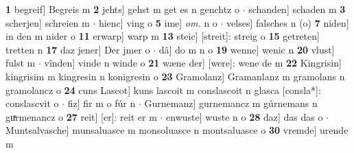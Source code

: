 \documentclass[8pt,a4paper,notitlepage]{article}
\begin{document}
\begin{table}[ht]
\begin{minipage}[t]{0.5\linewidth}
\textbf{1} begreif] Begreis m \textbf{2} jehts] gehst m get es n genchtz o  $\cdot$ schanden] schaden m \textbf{3} scherjen] schreien m  $\cdot$ hienc] ving o \textbf{5} ime] \textit{om.} n o  $\cdot$ velses] falsches n (o) \textbf{7} niden] in den m nider o \textbf{11} erwarp] warp m \textbf{13} steic] [streit]: streig o \textbf{15} getreten] tretten n \textbf{17} daz jener] Der jmer o  $\cdot$ dâ] do m n o \textbf{19} wenne] wenic n \textbf{20} vlust] fulst m  $\cdot$ vînden] vinde n winde o \textbf{21} wæne der] [were]: wene de m \textbf{22} Kingrisin] kingrisim m kingresin n konigresin o \textbf{23} Gramolanz] Gramanlanz m gramolans n gramolancz o \textbf{24} cuns Lascot] kuns lascoit m conslascoit n glasca [consla*]: conslascvit o  $\cdot$ fiz] fir m o fúr n  $\cdot$ Gurnemanz] gurnemancz m gúrnemans n guͯrmenancz o \textbf{27} reit] [er]: reit er m  $\cdot$ enwuste] wuste n o \textbf{28} daz] das das o  $\cdot$ Muntsalvasche] munsaluasce m monsoluasce n montsaluasce o \textbf{30} vremde] urende m \newline
\end{minipage}
\end{table}
\newpage
\end{document}

